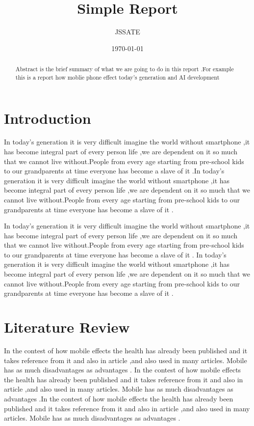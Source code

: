 \documentclass{article}
\title{Simple Report}
\author{JSSATE}
\date{\today}
\begin{document}
	\maketitle
	
	\begin{abstract}
		Abstract is the brief summary of what we are going to do in this report .For example this is a report how moblie phone effect today's generation and AI development
	\end{abstract}
	
	\section{Introduction}
	In today's generation it is very difficult imagine the world without smartphone ,it has become integral part of every person life ,we are dependent on it so much that we cannot live without.People from every age starting from pre-school kids to our grandparents at time everyone has become a slave of it .In today's generation it is very difficult imagine the world without smartphone ,it has become integral part of every person life ,we are dependent on it so much that we cannot live without.People from every age starting from pre-school kids to our grandparents at time everyone has become a slave of it .
	
	In today's generation it is very difficult imagine the world without smartphone ,it has become integral part of every person life ,we are dependent on it so much that we cannot live without.People from every age starting from pre-school kids to our grandparents at time everyone has become a slave of it . In today's generation it is very difficult imagine the world without smartphone ,it has become integral part of every person life ,we are dependent on it so much that we cannot live without.People from every age starting from pre-school kids to our grandparents at time everyone has become a slave of it .
	
	\section{Literature Review}
	In the contest of how mobile effects the health has already been published and it takes reference from it \cite{lecun2015deep}
	and also in article \cite{goodfellow2016deep},and also used in many articles. Mobile has as much disadvantages as advantages .
	In the contest of how mobile effects the health has already been published and it takes reference from it \cite{lecun2015deep}
	and also in article \cite{goodfellow2016deep},and also used in many articles. Mobile has as much disadvantages as advantages .In the contest of how mobile effects the health has already been published and it takes reference from it \cite{lecun2015deep}
	and also in article \cite{goodfellow2016deep},and also used in many articles. Mobile has as much disadvantages as advantages .
	
\end{document}
